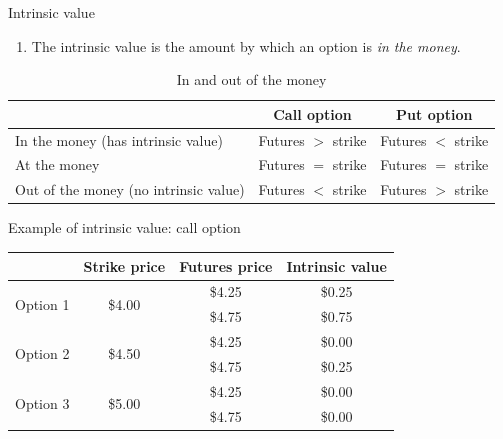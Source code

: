 \documentclass[table,xcolor=pdftex,dvipsnames]{beamer}\usepackage[]{graphicx}\usepackage[]{color}
\begin{document}
\begin{frame}{Intrinsic value}
\begin{enumerate}[label=\textbullet]
  \item The intrinsic value is the amount by which an option is \emph{in the money}.
\end{enumerate}
\vspace{-0.25in}
\begin{table}
\caption{In and out of the money}
\scriptsize
\begin{tabular}{l c c }
  \toprule
    & Call option & Put option \\
  \midrule
  In the money (has intrinsic value) & Futures $>$ strike & Futures $<$ strike\\
  \addlinespace[0.075in]
  At the money & Futures $=$ strike & Futures $=$ strike\\
  \addlinespace[0.075in]
  Out of the money (no intrinsic value) & Futures $<$ strike & Futures $>$ strike\\
  \bottomrule
\end{tabular}
\end{table}
\end{frame}


\begin{frame}{Example of intrinsic value: call option}
\begin{table}
\begin{tabular}{l c c c }
  \toprule
    & Strike price & Futures price & Intrinsic value \\
  \midrule
  \multirow{2}{*}{Option 1} & \multirow{2}{*}{\$4.00} & \$4.25 & \$0.25 \\
    &  & \$4.75 & \$0.75 \\
  \midrule
  \multirow{2}{*}{Option 2} & \multirow{2}{*}{\$4.50} & \$4.25 & \$0.00 \\
    &  & \$4.75 & \$0.25 \\
  \midrule
  \multirow{2}{*}{Option 3} & \multirow{2}{*}{\$5.00} & \$4.25 & \$0.00 \\
    &  & \$4.75 & \$0.00 \\
  \bottomrule
\end{tabular}
\end{table}
\end{frame}

\end{document}
